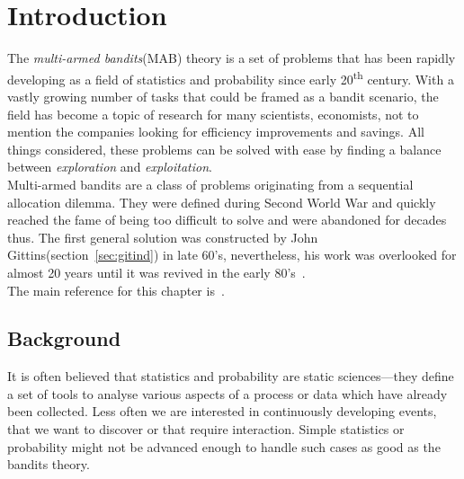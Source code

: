\documentclass[12pt, a4paper, pdflatex, leqno, twoside]{report}
\newcommand{\ts}{\textsuperscript}
\begin{document}
\newpage
\thispagestyle{empty}
\mbox{}

\newpage
{
\thispagestyle{empty}
\cleardoublepage
\pagestyle{plain}


\tableofcontents
\thispagestyle{empty}

}
\newpage
\thispagestyle{empty}
\mbox{}



\chapter{Introduction\label{chap:intro}}
\setcounter{page}{1}
The \emph{multi-armed bandits}(MAB) theory is a set of problems that has been rapidly developing as a field of 
statistics and probability since early 20\ts{th} century. With a vastly 
growing number of tasks that could be framed as a bandit scenario, the field has 
become a topic of research for many scientists, economists, not to mention 
the companies looking for efficiency improvements and savings. All things 
considered, these problems can be solved with ease by finding a balance between 
\emph{exploration} and \emph{exploitation}.\\

Multi-armed bandits are a class of problems originating from a sequential 
allocation dilemma. They were defined during Second World War and quickly 
reached the fame of being too difficult to solve and were abandoned for 
decades thus. The first general solution was constructed by John Gittins(section~\ref{sec:gitind}) 
in late 
60's, nevertheless, his work was overlooked for almost 20 years until it was revived in the early 80's~\citep{gittins+glazebrook+weber}.\\

\noindent The main reference for this chapter is~\citep{berry+firstedt}.\\


\section{Background}
It is often believed that statistics and probability are static sciences---they define a set of tools to analyse various aspects of a process or data which have already been collected.  
Less often we are interested in continuously developing events, that we want to discover or that require interaction. Simple statistics or probability might not be advanced enough to 
handle such cases as good as the bandits theory.\\
\end{document}
